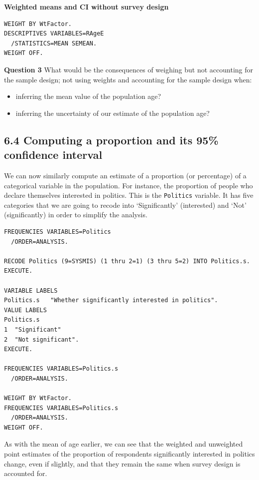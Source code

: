\documentclass[
  14,
  a4paper,
  DIV=11,
  numbers=noendperiod]{scrartcl}
\providecommand{\tightlist}{%
  \setlength{\itemsep}{0pt}\setlength{\parskip}{0pt}}\usepackage{longtable,booktabs,array}
\begin{document}
\textbf{Weighted means and CI without survey design}

\begin{verbatim}
WEIGHT BY WtFactor.
DESCRIPTIVES VARIABLES=RAgeE
  /STATISTICS=MEAN SEMEAN.
WEIGHT OFF.
\end{verbatim}

\textbf{Question 3} What would be the consequences of weighing but not
accounting for the sample design; not using weights and accounting for
the sample design when:

\begin{itemize}
\tightlist
\item
  inferring the mean value of the population age?
\item
  inferring the uncertainty of our estimate of the population age?
\end{itemize}

\hypertarget{computing-a-proportion-and-its-95-confidence-interval-1}{%
\subsection{6.4 Computing a proportion and its 95\% confidence
interval}\label{computing-a-proportion-and-its-95-confidence-interval-1}}

We can now similarly compute an estimate of a proportion (or percentage)
of a categorical variable in the population. For instance, the
proportion of people who declare themselves interested in politics. This
is the \texttt{Politics} variable. It has five categories that we are
going to recode into `Significantly' (interested) and `Not'
(significantly) in order to simplify the analysis.

\begin{verbatim}
FREQUENCIES VARIABLES=Politics
  /ORDER=ANALYSIS.

RECODE Politics (9=SYSMIS) (1 thru 2=1) (3 thru 5=2) INTO Politics.s.
EXECUTE.

VARIABLE LABELS
Politics.s   "Whether significantly interested in politics".
VALUE LABELS
Politics.s
1  "Significant"
2  "Not significant". 
EXECUTE.

FREQUENCIES VARIABLES=Politics.s
  /ORDER=ANALYSIS.

WEIGHT BY WtFactor.
FREQUENCIES VARIABLES=Politics.s
  /ORDER=ANALYSIS.
WEIGHT OFF.
\end{verbatim}

As with the mean of age earlier, we can see that the weighted and
unweighted point estimates of the proportion of respondents
significantly interested in politics change, even if slightly, and that
they remain the same when survey design is accounted for.
\end{document}
